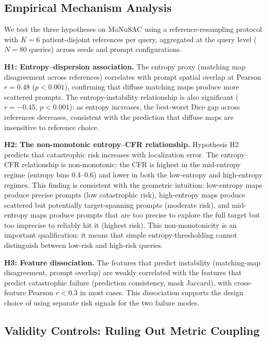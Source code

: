 \documentclass[11pt]{article}
\begin{document}
\subsection{Empirical Mechanism Analysis}

We test the three hypotheses on MoNuSAC using a reference-resampling
protocol with $K=6$ patient-disjoint references per query, aggregated at the
query level ($N=80$ queries) across seeds and prompt configurations.

\medskip\noindent
\textbf{H1: Entropy--dispersion association.} The entropy proxy (matching
map disagreement across references) correlates with prompt spatial overlap
at Pearson $r = 0.48$ ($p < 0.001$), confirming that diffuse matching maps
produce more scattered prompts. The entropy-instability relationship is also
significant ($r = -0.45$, $p < 0.001$): as entropy increases, the
best-worst Dice gap across references decreases, consistent with the
prediction that diffuse maps are insensitive to reference choice.

\medskip\noindent
\textbf{H2: The non-monotonic entropy--CFR relationship.} Hypothesis H2
predicts that catastrophic risk increases with localization error. The
entropy--CFR relationship is non-monotonic: the CFR is highest in the
mid-entropy regime (entropy bins 0.4--0.6) and lower in both the low-entropy
and high-entropy regimes. This finding is consistent with the geometric
intuition: low-entropy maps produce precise prompts (low catastrophic risk),
high-entropy maps produce scattered but potentially target-spanning prompts
(moderate risk), and mid-entropy maps produce prompts that are too precise
to explore the full target but too imprecise to reliably hit it
(highest risk). This non-monotonicity is an important qualification: it
means that simple entropy-thresholding cannot distinguish between low-risk
and high-risk queries.

\medskip\noindent
\textbf{H3: Feature dissociation.} The features that predict instability
(matching-map disagreement, prompt overlap) are weakly correlated with the
features that predict catastrophic failure (prediction consistency, mask
Jaccard), with cross-feature Pearson $r < 0.3$ in most cases. This
dissociation supports the design choice of using separate risk signals for
the two failure modes.

\subsection{Validity Controls: Ruling Out Metric Coupling}
\label{sec:validity}
\end{document}
